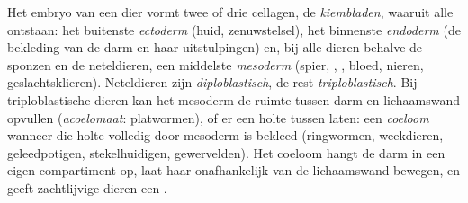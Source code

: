 \begin{definition}\label{def:b1:body-plans-tissues:layers}
Het embryo van een dier vormt twee of drie cellagen, de
\emph{kiembladen}, waaruit alle  ontstaan: het
buitenste \emph{ectoderm} (huid, zenuwstelsel), het
binnenste \emph{endoderm} (de bekleding van de darm en haar
uitstulpingen) en, bij alle dieren behalve de sponzen en de neteldieren, een
middelste \emph{mesoderm} (spier, , , bloed,
nieren, geslachtsklieren). Neteldieren zijn \emph{diploblastisch}, de rest
\emph{triploblastisch}. Bij triploblastische dieren kan het mesoderm de ruimte
tussen darm en lichaamswand opvullen (\emph{acoelomaat}: platwormen), of er een
holte tussen laten: een \emph{coeloom} wanneer die holte volledig
door mesoderm is bekleed (ringwormen, weekdieren, geleedpotigen,
stekelhuidigen, gewervelden). Het coeloom hangt de darm in een eigen
compartiment op, laat haar onafhankelijk van de lichaamswand bewegen, en geeft
zachtlijvige dieren een .
\end{definition}


